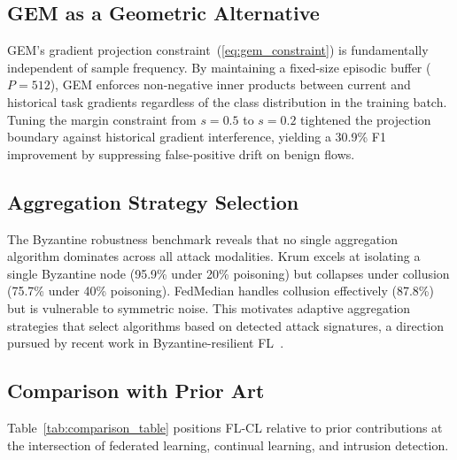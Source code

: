 \documentclass[journal,10pt,twocolumn]{IEEEtran}
\begin{document}
\subsection{GEM as a Geometric Alternative}
GEM's gradient projection constraint~(\ref{eq:gem_constraint}) is fundamentally independent of sample frequency. By maintaining a fixed-size episodic buffer ($P=512$), GEM enforces non-negative inner products between current and historical task gradients regardless of the class distribution in the training batch. Tuning the margin constraint from $s=0.5$ to $s=0.2$ tightened the projection boundary against historical gradient interference, yielding a 30.9\% F1 improvement by suppressing false-positive drift on benign flows.

\subsection{Aggregation Strategy Selection}
The Byzantine robustness benchmark reveals that no single aggregation algorithm dominates across all attack modalities. Krum excels at isolating a single Byzantine node (95.9\% under 20\% poisoning) but collapses under collusion (75.7\% under 40\% poisoning). FedMedian handles collusion effectively (87.8\%) but is vulnerable to symmetric noise. This motivates adaptive aggregation strategies that select algorithms based on detected attack signatures, a direction pursued by recent work in Byzantine-resilient FL~\cite{yin2018byzantine}.

\subsection{Comparison with Prior Art}
Table~\ref{tab:comparison_table} positions FL-CL relative to prior contributions at the intersection of federated learning, continual learning, and intrusion detection.
\end{document}

